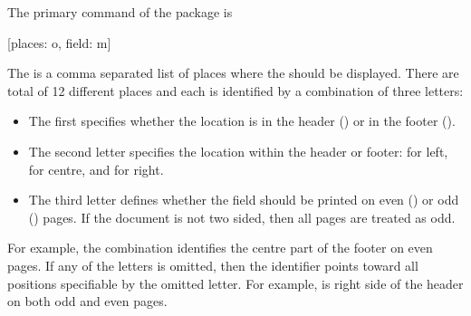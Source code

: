 The primary command of the package is
\begin{lscommand}
  [places: o, field: m]
\end{lscommand}
The  is a comma separated list of places where the  should be displayed. There are total of 12 different places and each is identified by a
combination of three letters:
\begin{itemize}
  \item The first specifies whether the location is in the header () or
        in the footer ().
  \item The second letter specifies the location within the header or footer:
         for left,  for centre, and  for right.
  \item The third letter defines whether the field should be printed on even
        () or odd () pages. If the document is not two sided,
        then all pages are treated as odd.
\end{itemize}
For example, the combination  identifies the centre part of the
footer on even pages. If any of the letters is omitted, then the identifier
points toward all positions specifiable by the omitted letter. For example,
 is right side of the header on both odd and even pages.

